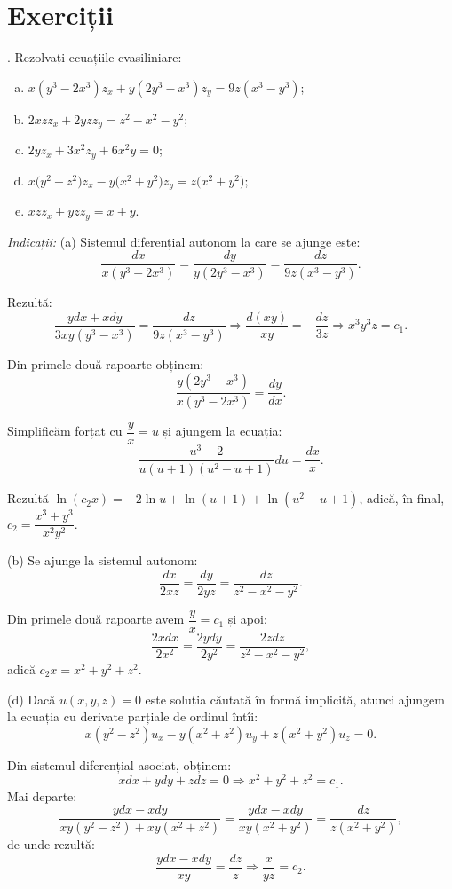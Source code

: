 
\section{Exerciții}

\indent{}. Rezolvați ecuațiile cvasiliniare:
\begin{enumerate}[(a)]
\item $x(y^3 - 2x^3)z_x + y(2y^3 - x^3)z_y = 9z(x^3 - y^3) $;
\item $ 2xzz_x + 2yzz_y = z^2 - x^2 - y^2 $;
\item $ 2y z_x + 3x^2 z_y + 6x^2 y = 0 $;
\item $ x \Big( y^2 - z^2 \Big) z_x - y \Big( x^2 + y^2 \Big) z_y = z \Big( x^2 + y^2 \Big) $;
\item $ xz z_x + yz z_y = x + y $.
\end{enumerate}

\emph{Indicații:} (a) Sistemul diferențial autonom la care se ajunge este:
\[
  \dfrac{dx}{x(y^3 - 2x^3)} = \dfrac{dy}{y(2y^3 - x^3)} = \dfrac{dz}{9z(x^3 - y^3)}.
\]

Rezultă:
\[
  \dfrac{ydx + xdy}{3xy(y^3 - x^3)} = \dfrac{dz}{9z(x^3 - y^3)} \Rightarrow %
  \dfrac{d(xy)}{xy} = -\dfrac{dz}{3z} \Rightarrow x^3 y^3 z = c_1.
\]

Din primele două rapoarte obținem:
\[
  \dfrac{y(2y^3 - x^3)}{x(y^3 - 2x^3)} = \dfrac{dy}{dx}.
\]

Simplificăm forțat cu $ \dfrac{y}{x} = u $ și ajungem la ecuația:
\[
  \dfrac{u^3 - 2}{u(u+1)(u^2 - u + 1)} du = \dfrac{dx}{x}.
\]

Rezultă $ \ln(c_2 x) = -2\ln u + \ln(u + 1) + \ln(u^2 - u + 1) $, adică, în final,
$ c_2 = \dfrac{x^3 + y^3}{x^2 y^2} $.

(b) Se ajunge la sistemul autonom:
\[
  \dfrac{dx}{2xz} = \dfrac{dy}{2yz} = \dfrac{dz}{z^2 - x^2 - y^2}.
\]

Din primele două rapoarte avem $ \dfrac{y}{x} = c_1 $ și apoi:
\[
  \dfrac{2xdx}{2x^2} = \dfrac{2ydy}{2y^2} = \dfrac{2zdz}{z^2 - x^2 - y^2},
\]
adică $ c_2x = x^2 + y^2 + z^2 $.

(d) Dacă $ u(x, y, z) = 0 $ este soluția căutată în formă implicită, atunci ajungem
la ecuația cu derivate parțiale de ordinul întîi:
\[
  x(y^2 - z^2)u_x - y(x^2 + z^2) u_y + z(x^2 + y^2) u_z = 0.
\]

Din sistemul diferențial asociat, obținem:
\[
  xdx + ydy + zdz = 0 \Rightarrow x^2 + y^2 + z^2 = c_1.
\]
Mai departe:
\[
  \dfrac{ydx - xdy}{xy(y^2 - z^2) + xy(x^2 + z^2)} = %
  \dfrac{ydx - xdy}{xy(x^2 + y^2)} = \dfrac{dz}{z(x^2 + y^2)},
\]
de unde rezultă:
\[
  \dfrac{ydx - xdy}{xy} = \dfrac{dz}{z} \Rightarrow \dfrac{x}{yz} = c_2.
\]

